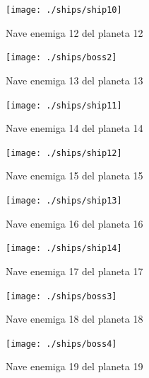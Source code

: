 \documentclass[a4paper,10pt]{article}
\begin{document}
\begin{figure}

\begin{minipage}[b]{0.5\linewidth}
\centering
\texttt{[image: ./ships/ship10]}
\caption{Nave enemiga 12 del planeta 12} \label{figura12}
\end{minipage}
\hspace{0.5cm}
\begin{minipage}[b]{0.5\linewidth}
\centering
\texttt{[image: ./ships/boss2]}
\caption{Nave enemiga 13 del planeta 13} \label{figura13}
\end{minipage}

\end{figure}

\begin{figure}

\begin{minipage}[b]{0.5\linewidth}
\centering
\texttt{[image: ./ships/ship11]}
\caption{Nave enemiga 14 del planeta 14} \label{figura14}
\end{minipage}
\hspace{0.5cm}
\begin{minipage}[b]{0.5\linewidth}
\centering
\texttt{[image: ./ships/ship12]}
\caption{Nave enemiga 15 del planeta 15} \label{figura15}
\end{minipage}

\end{figure}

\begin{figure}

\begin{minipage}[b]{0.5\linewidth}
\centering
\texttt{[image: ./ships/ship13]}
\caption{Nave enemiga 16 del planeta 16} \label{figura16}
\end{minipage}
\hspace{0.5cm}
\begin{minipage}[b]{0.5\linewidth}
\centering
\texttt{[image: ./ships/ship14]}
\caption{Nave enemiga 17 del planeta 17} \label{figura17}
\end{minipage}

\end{figure}


\begin{figure}

\begin{minipage}[b]{0.5\linewidth}
\centering
\texttt{[image: ./ships/boss3]}
\caption{Nave enemiga 18 del planeta 18} \label{figura18}
\end{minipage}
\hspace{0.5cm}
\begin{minipage}[b]{0.5\linewidth}
\centering
\texttt{[image: ./ships/boss4]}
\caption{Nave enemiga 19 del planeta 19} \label{figura19}
\end{minipage}

\end{figure}
\cleardoublepage


\cleardoublepage
\end{document}
